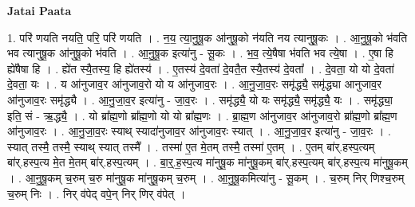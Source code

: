 \documentclass[17pt]{extarticle}
\begin{document}
\textbf{Jatai Paata} \newline

1. परि॑ णयति नयति॒ परि॒ परि॑ णयति । . न॒य॒ त्या॒नु॒षू॒क आ॑नुषू॒को न॑यति नय त्यानुषू॒कः । . आ॒नु॒षू॒को भ॑वति भव त्यानुषू॒क आ॑नुषू॒को भ॑वति । . आ॒नु॒षू॒क इत्या॑नु - सू॒कः । . भ॒व॒ त्ये॒षैषा भ॑वति भव त्ये॒षा । . ए॒षा हि ह्ये॑षैषा हि । . ह्ये॑त स्यै॒तस्य॒ हि ह्ये॑तस्य॑ । . ए॒तस्य॑ दे॒वता॑ दे॒वतै॒त स्यै॒तस्य॑ दे॒वता᳚ । . दे॒वता॒ यो यो दे॒वता॑ दे॒वता॒ यः । . य आ॑नुजाव॒र आ॑नुजाव॒रो यो य आ॑नुजाव॒रः । . आ॒नु॒जा॒व॒रः समृ॑द्ध्यै॒ समृ॑द्ध्या आनुजाव॒र आ॑नुजाव॒रः समृ॑द्ध्यै । . आ॒नु॒जा॒व॒र इत्या॑नु - जा॒व॒रः । . समृ॑द्ध्यै॒ यो यः समृ॑द्ध्यै॒ समृ॑द्ध्यै॒ यः । . समृ॑द्ध्या॒ इति॒ सं - ऋ॒द्ध्यै॒ । . यो ब्रा᳚ह्म॒णो ब्रा᳚ह्म॒णो यो यो ब्रा᳚ह्म॒णः । . ब्रा॒ह्म॒ण आ॑नुजाव॒र आ॑नुजाव॒रो ब्रा᳚ह्म॒णो ब्रा᳚ह्म॒ण आ॑नुजाव॒रः । . आ॒नु॒जा॒व॒रः स्याथ् स्यादा॑नुजाव॒र आ॑नुजाव॒रः स्यात् । . आ॒नु॒जा॒व॒र इत्या॑नु - जा॒व॒रः । . स्यात् तस्मै॒ तस्मै॒ स्याथ् स्यात् तस्मै᳚ । . तस्मा॑ ए॒त मे॒तम् तस्मै॒ तस्मा॑ ए॒तम् । . ए॒तम् बा॑र्.हस्प॒त्यम् बा॑र्.हस्प॒त्य मे॒त मे॒तम् बा॑र्.हस्प॒त्यम् । . बा॒र्॒.ह॒स्प॒त्य मा॑नुषू॒क मा॑नुषू॒कम् बा॑र्.हस्प॒त्यम् बा॑र्.हस्प॒त्य मा॑नुषू॒कम् । . आ॒नु॒षू॒कम् च॒रुम् च॒रु मा॑नुषू॒क मा॑नुषू॒कम् च॒रुम् । . आ॒नु॒षू॒कमित्या॑नु - सू॒कम् । . च॒रुम् निर् णिश्च॒रुम् च॒रुम् निः । . निर् व॑पेद् वपे॒न् निर् णिर् व॑पेत् । \newline
\end{document}
